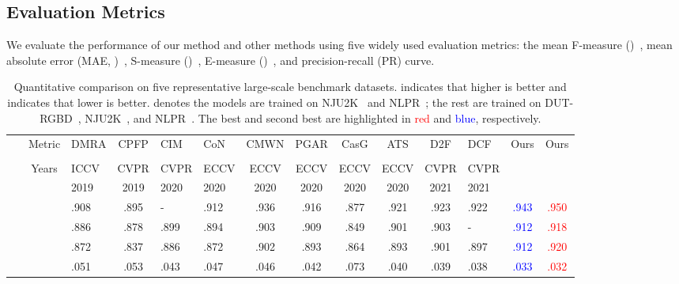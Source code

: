 \documentclass[runningheads]{llncs}
\begin{document}
	\subsection{Evaluation Metrics}
	We evaluate the performance of our method and other methods using
	five widely used evaluation metrics: the mean F-measure ()~\cite{achanta2009frequency}, mean absolute error (MAE, )~\cite{borji2015salient}, S-measure ()~\cite{fan2017structure}, E-measure ()~\cite{fan2018enhanced}, and precision-recall (PR) curve.
	
	\begin{table}[t]
		\scriptsize
		\begin{center}
			\caption{Quantitative comparison on five representative large-scale benchmark datasets.  indicates that higher is better and  indicates that lower is better.  denotes the models are trained on NJU2K~\cite{ju2014depth} and NLPR~\cite{peng2014rgbd}; the rest are trained on DUT-RGBD~\cite{piao2019depth}, NJU2K~\cite{ju2014depth}, and NLPR~\cite{peng2014rgbd}. The best and second best are highlighted in \textcolor{red}{red} and \textcolor{blue}{blue}, respectively.}
			\label{table:qua}
			\begin{tabular}{p{0.7cm}<{\centering}|c|p{0.85cm}<{\centering}cp{0.75cm}<{\centering}p{0.75cm}<{\centering}cccccp{0.75cm}<{\centering}|cc}
				\hline
				\hline
				
				\multirow{2}{*}{} & \multirow{2}{*}{Metric} & DMRA & CPFP & CIM & CoN & CMWN & PGAR & CasG & ATS & D2F & DCF & Ours & Ours  \\
				&  & \cite{piao2019depth} & \cite{zhao2019contrast}  & \cite{zhang2020select} & \cite{ji2020accurate} & \cite{li2020cross}  & \cite{chen2020progressively} & \cite{luo2020cascade}  & \cite{zhang2020asymmetric} & \cite{sun2021deep} & \cite{ji2021calibrated} &  & \\ \hline
				\multirow{2}{*}{} & \multirow{2}{*}{Years} & ICCV & CVPR & CVPR & ECCV & ECCV & ECCV & ECCV & ECCV & CVPR & CVPR & &  \\ 
				&  & 2019 & 2019 & 2020 & 2020 & 2020 & 2020 & 2020 & 2020 & 2021 & 2021 & & \\ \hline
				
				\multirow{4}{*}{\rotatebox{90}{NJU2K}~\rotatebox{90}{~\cite{ju2014depth}}}    
				&  
				& .908 & .895 & - & .912 & .936 & .916 & .877 & .921 & .923 & .922 & \textcolor{blue}{.943} & \textcolor{red}{.950} \\
				&  
				& .886 & .878 & .899 & .894 & .903 & .909 & .849 & .901 & .903 & - & \textcolor{blue}{.912} & \textcolor{red}{.918} \\
				&  
				& .872 & .837 & .886 & .872 & .902 & .893 & .864 & .893 & .901 & .897 & \textcolor{blue}{.912} & \textcolor{red}{.920} \\
				&  
				& .051 & .053 & .043 & .047 & .046 & .042 & .073 & .040 & .039 & .038 & \textcolor{blue}{.033} & \textcolor{red}{.032} \\ \hline
				

\end{tabular}
\end{center}
\end{table}
\end{document}
